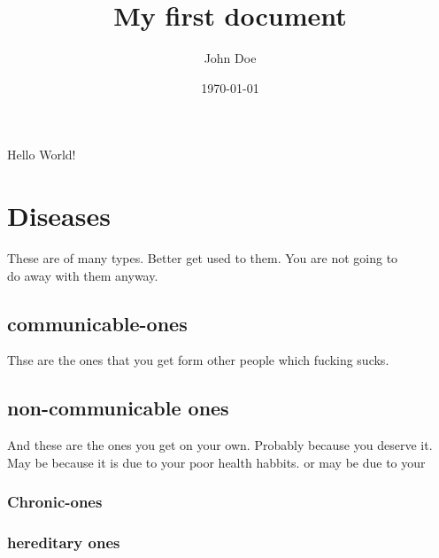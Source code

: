 \documentclass{article}
\title{My first document}
\date{\today}
\author{John Doe}
\begin{document}
  \maketitle
  \newpage

  
  Hello World!
  \section{Diseases}
These are of many types. Better get used to them. You are not going to \\
do away with them anyway. 
  \subsection{communicable-ones}
Thse are the ones that you get form other people which fucking sucks.

  \subsection{non-communicable ones}
And these are the ones you get on your own. Probably because you deserve it.\\
May be because it is due to your poor health habbits. or may be due to your \\

  \subsubsection{Chronic-ones}
  \subsubsection{hereditary ones}

  
\end{document}
